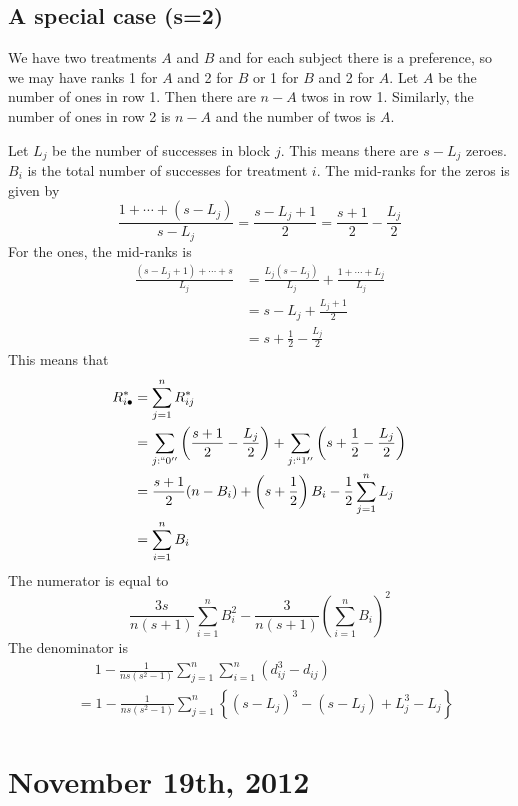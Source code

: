 \documentclass[a4paper,12pt]{amsart}
\newcommand{\sumin}{\sum_{i=1}^n}
\newcommand{\sumjn}{\sum_{j=1}^n}
\begin{document}
\subsection{A special case (s=2)}
We have two treatments $A$ and $B$ and for each subject there is a preference, so we may have ranks 1 for $A$ and 2 for $B$ or 1 for $B$ and 2 for $A$. Let $A$ be the number of ones in row 1. Then there are $n-A$ twos in row 1. Similarly, the number of ones in row 2 is $n-A$ and the number of twos is $A$.

Let $L_j$ be the number of successes in block $j$. This means there are $s-L_j$ zeroes. $B_i$ is the total number of successes for treatment $i$. The mid-ranks for the zeros is given by
\[\frac{1 + \cdots + (s - L_j)}{s-L_j} = \frac{s-L_j + 1}{2} = \frac{s+1}{2} - \frac{L_j}{2}\]
For the ones, the mid-ranks is
\begin{align*}
\frac{(s-L_j+1) + \cdots + s}{L_j} &= \frac{L_j(s - L_j)}{L_j} + \frac{1 + \cdots + L_j}{L_j}\\
&= s - L_j + \frac{L_j+1}{2}\\
&= s + \frac{1}{2} - \frac{L_j}{2} 
\end{align*}
This means that 
\begin{align*}
R_{i\bullet}^* &= \sumjn R_{ij}^*\\
&= \sum_{j: ``0''}\left(\frac{s+1}{2} - \frac{L_j}{2}\right) + \sum_{j: ``1''}\left(s + \frac{1}{2} - \frac{L_j}{2}\right)\\
&= \frac{s+1}{2}(n-B_i) + \left(s + \frac{1}{2}\right)B_i - \frac{1}{2}\sumjn L_j\\
&= \sumin B_i
\end{align*}
The numerator is equal to
\[\frac{3s}{n(s+1)}\sumin B_i^2 - \frac{3}{n(s+1)}\left(\sumin B_i\right)^2\]
The denominator is
\begin{align*}
&\quad \;1 - \frac{1}{ns(s^2-1)}\sumjn \sumin (d_{ij}^3 - d_{ij})\\
&= 1 - \frac{1}{ns(s^2-1)} \sumjn \left\{(s-L_j)^3 - (s - L_j) + L_j^3 - L_j \right\}
\end{align*}


\section{November 19th, 2012}
\end{document}
